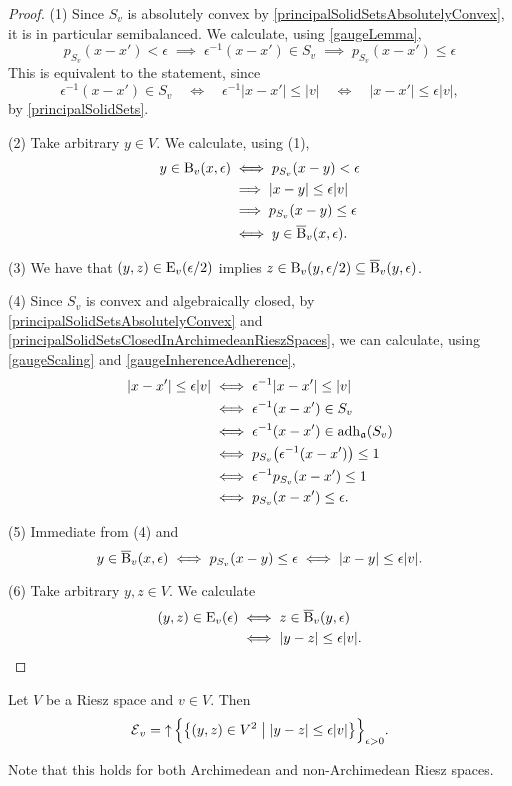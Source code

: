 \begin{proof}
(1) Since $S_v$ is absolutely convex by \ref{principalSolidSetsAbsolutelyConvex}, it is in particular semibalanced.  We calculate, using \ref{gaugeLemma},
\[ p_{S_v}(x-x') < \epsilon \;\implies\; \epsilon^{-1}(x-x') \in S_v \;\implies\; p_{S_v}(x-x') \leq \epsilon \]
This is equivalent to the statement, since
\[ \epsilon^{-1}(x-x') \in S_v \quad\iff\quad \epsilon^{-1}|x-x'| \leq |v| \quad\iff\quad |x-x'| \leq \epsilon |v|, \]
by \ref{principalSolidSets}.

(2) Take arbitrary $y\in V$. We calculate, using (1),
\begin{align*}
y \in \operatorname{B}_v(x, \epsilon) &\iff p_{S_v}(x-y) < \epsilon \\
&\implies |x-y| \leq \epsilon |v| \\
&\implies p_{S_v}(x-y) \leq \epsilon \\
&\iff y \in \operatorname{\overline{B}}_v(x, \epsilon).
\end{align*}

(3) We have that $(y,z) \in \operatorname{E}_v(\epsilon/2)$ implies $z\in \operatorname{B}_v(y,\epsilon /2) \subseteq \operatorname{\overline{B}}_v(y,\epsilon)$.

(4) Since $S_v$ is convex and algebraically closed, by \ref{principalSolidSetsAbsolutelyConvex} and \ref{principalSolidSetsClosedInArchimedeanRieszSpaces}, we can calculate, using \ref{gaugeScaling} and \ref{gaugeInherenceAdherence},
\begin{align*}
|x-x'| \leq \epsilon|v| &\iff \epsilon^{-1}|x-x'| \leq |v| \\
&\iff \epsilon^{-1}(x-x') \in S_v \\
&\iff \epsilon^{-1}(x-x') \in \operatorname{adh}_{\mathfrak{a}}(S_v) \\
&\iff p_{S_v}\big(\epsilon^{-1}(x-x')\big) \leq 1 \\
&\iff \epsilon^{-1}p_{S_v}(x-x') \leq 1 \\
&\iff p_{S_v}(x-x') \leq \epsilon.
\end{align*}

(5) Immediate from (4) and
\[ y \in \operatorname{\overline{B}}_v(x, \epsilon) \iff p_{S_v}(x-y) \leq \epsilon \iff |x-y| \leq \epsilon|v|. \] 

(6) Take arbitrary $y,z \in V$. We calculate
\begin{align*}
(y,z) \in \operatorname{E}_v(\epsilon) &\iff z\in \operatorname{\overline{B}}_v(y,\epsilon) \\
&\iff |y-z| \leq \epsilon |v|.
\end{align*}
\end{proof}
\begin{corollary} \label{vEntouragesBase}
Let $V$ be a Riesz space and $v\in V$. Then
\[ \entourages_v = \upset \Big\{\setbuilder{(y,z)\in V^2}{|y-z| \leq \epsilon |v|}\Big\}_{\epsilon > 0}. \]
\end{corollary}
Note that this holds for both Archimedean and non-Archimedean Riesz spaces.

